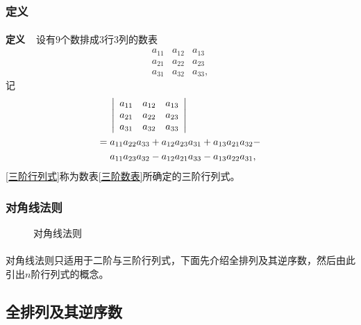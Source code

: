 \subsubsection{定义}
\paragraph{}
\textbf{定义~~}设有$9$个数排成$3$行$3$列的数表
\begin{equation}
  \label{三阶数表}
  \begin{array}{ccc}
    a_{11} & a_{12} & a_{13} \\
    a_{21} & a_{22} & a_{23} \\
    a_{31} & a_{32} & a_{33},
  \end{array}
\end{equation}
记
\begin{align}
\centering
  \begin{split}
    \label{三阶行列式}
    &\;\left|\begin{array}{ccc}
      a_{11} & a_{12} & a_{13} \\
      a_{21} & a_{22} & a_{23} \\
      a_{31} & a_{32} & a_{33}
    \end{array}\right| \\
    =&\; a_{11}a_{22}a_{33} + a_{12}a_{23}a_{31} + a_{13}a_{21}a_{32} - \\
    &\; a_{11}a_{23}a_{32} - a_{12}a_{21}a_{33} - a_{13}a_{22}a_{31},
  \end{split}
\end{align}
\eqref{三阶行列式}称为数表\eqref{三阶数表}所确定的三阶行列式。

\subsubsection{对角线法则}
\begin{figure}[H]
\centering
  
  \caption{对角线法则}
  \label{图:三阶对角线法则}
\end{figure}

\paragraph{}
对角线法则只适用于二阶与三阶行列式，下面先介绍全排列及其逆序数，然后由此引出$n$阶行列式的概念。

\subsection{全排列及其逆序数}
